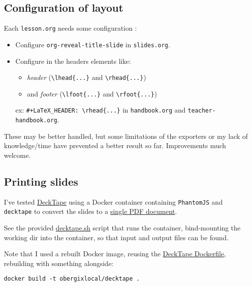 \documentclass[a4paper]{article}
\newenvironment{NOTES}{\begin{lrbox}{\mybox}\begin{minipage}{0.9\textwidth}\begin{shaded}}{\end{shaded}\end{minipage}\end{lrbox}\fbox{\usebox{\mybox}}}
\begin{document}
\subsection{Configuration of layout}
\label{sec:org2fc34d5}

Each \texttt{lesson.org} needs some configuration :
\begin{itemize}
\item Configure \texttt{org-reveal-title-slide} in \texttt{slides.org}.

\item Configure in the headers elements like:
\begin{itemize}
\item \emph{header} (\texttt{\textbackslash{}lhead\{...\}} and \texttt{\textbackslash{}rhead\{...\}})
\item and \emph{footer} (\texttt{\textbackslash{}lfoot\{...\}} and \texttt{\textbackslash{}rfoot\{...\}})
\end{itemize}

ex: \texttt{\#+LaTeX\_HEADER: \textbackslash{}rhead\{...\}} in \texttt{handbook.org} and
  \texttt{teacher-handbook.org}.
\end{itemize}

\begin{NOTES}
These may be better handled, but some limitations of the exporters or
my lack of knowledge/time have prevented a better result so
far. Improvements much welcome.
\end{NOTES}


\subsection{Printing slides}
\label{sec:orgd547078}

I've tested \href{https://github.com/astefanutti/decktape}{DeckTape} using a Docker container containing \texttt{PhantomJS} and
\texttt{decktape} to convert the slides to a \href{slides.pdf}{single PDF document}.

See the provided \href{bin/decktape.sh}{decktape.sh} script that runs the container, bind-mounting the
working dir into the container, so that input and output files can be
found.

Note that I used a rebuilt Docker image, reusing the \href{https://raw.githubusercontent.com/astefanutti/decktape/master/Dockerfile}{DeckTape
Dockerfile}, rebuilding with something alongside:
\begin{verbatim}
docker build -t obergixlocal/decktape .
\end{verbatim}
\end{document}
